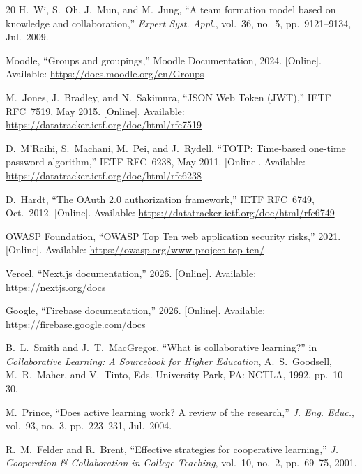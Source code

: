 \documentclass[conference]{IEEEtran}
\begin{document}
\begin{thebibliography}{20}
H.~Wi, S.~Oh, J.~Mun, and M.~Jung, ``A team formation model based on knowledge and collaboration,'' \textit{Expert Syst. Appl.}, vol.~36, no.~5, pp.~9121--9134, Jul.\ 2009.

Moodle, ``Groups and groupings,'' Moodle Documentation, 2024. [Online]. Available: \url{https://docs.moodle.org/en/Groups}

M.~Jones, J.~Bradley, and N.~Sakimura, ``JSON Web Token (JWT),'' IETF RFC~7519, May 2015. [Online]. Available: \url{https://datatracker.ietf.org/doc/html/rfc7519}

D.~M'Raihi, S.~Machani, M.~Pei, and J.~Rydell, ``TOTP: Time-based one-time password algorithm,'' IETF RFC~6238, May 2011. [Online]. Available: \url{https://datatracker.ietf.org/doc/html/rfc6238}

D.~Hardt, ``The OAuth 2.0 authorization framework,'' IETF RFC~6749, Oct.\ 2012. [Online]. Available: \url{https://datatracker.ietf.org/doc/html/rfc6749}

OWASP Foundation, ``OWASP Top Ten web application security risks,'' 2021. [Online]. Available: \url{https://owasp.org/www-project-top-ten/}

Vercel, ``Next.js documentation,'' 2026. [Online]. Available: \url{https://nextjs.org/docs}

Google, ``Firebase documentation,'' 2026. [Online]. Available: \url{https://firebase.google.com/docs}

B.~L.~Smith and J.~T.~MacGregor, ``What is collaborative learning?'' in \textit{Collaborative Learning: A Sourcebook for Higher Education}, A.~S.~Goodsell, M.~R.~Maher, and V.~Tinto, Eds.\hspace{0pt} University Park, PA: NCTLA, 1992, pp.~10--30.

M.~Prince, ``Does active learning work? A review of the research,'' \textit{J. Eng. Educ.}, vol.~93, no.~3, pp.~223--231, Jul.\ 2004.

R.~M.~Felder and R.~Brent, ``Effective strategies for cooperative learning,'' \textit{J. Cooperation \& Collaboration in College Teaching}, vol.~10, no.~2, pp.~69--75, 2001.

\end{thebibliography}
\end{document}
